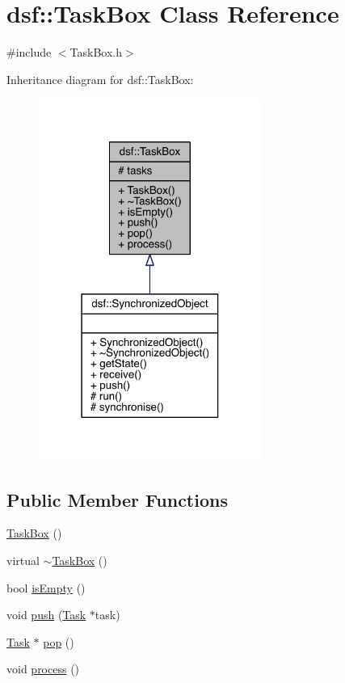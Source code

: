 \hypertarget{classdsf_1_1_task_box}{}\section{dsf\+:\+:Task\+Box Class Reference}
\label{classdsf_1_1_task_box}


{\ttfamily \#include $<$Task\+Box.\+h$>$}



Inheritance diagram for dsf\+:\+:Task\+Box\+:\nopagebreak
\begin{figure}[H]
\begin{center}
\leavevmode
\includegraphics[width=207pt]{classdsf_1_1_task_box__inherit__graph}
\end{center}
\end{figure}
\subsection*{Public Member Functions}
\begin{DoxyCompactItemize}
\item 
\hyperlink{classdsf_1_1_task_box_a931c925e0a4956ee6bc1674f43ecc0a0}{Task\+Box} ()
\item 
virtual \hyperlink{classdsf_1_1_task_box_a20684b560a76fc97dd8e3f879ea240df}{$\sim$\+Task\+Box} ()
\item 
bool \hyperlink{classdsf_1_1_task_box_a7e67fd9b7104d24cb4be54f6a48eb8c9}{is\+Empty} ()
\item 
void \hyperlink{classdsf_1_1_task_box_a0ec4e52a625fae00e05b072d6434eef1}{push} (\hyperlink{classdsf_1_1_task}{Task} $\ast$task)
\item 
\hyperlink{classdsf_1_1_task}{Task} $\ast$ \hyperlink{classdsf_1_1_task_box_a656f4778edd42d43ff7516de3fa528ef}{pop} ()
\item 
void \hyperlink{classdsf_1_1_task_box_ad35070ac305146aaa4073b2078d9209e}{process} ()
\end{DoxyCompactItemize}
